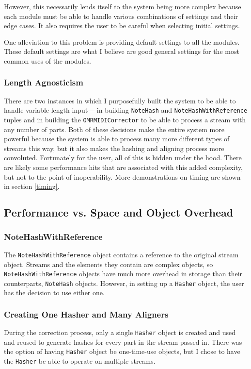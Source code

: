 However, this necessarily lends itself to the system being more complex because each module must be able to handle various combinations of settings and their edge cases. It also requires the user to be careful when selecting initial settings. 

One alleviation to this problem is providing default settings to all the modules. These default settings are what I believe are good general settings for the most common uses of the modules. 

\subsubsection{Length Agnosticism}
There are two instances in which I purposefully built the system to be able to handle variable length input--- in building \texttt{NoteHash} and \texttt{NoteHashWithReference} tuples and in building the \texttt{OMRMIDICorrector} to be able to process a stream with any number of parts. Both of these decisions make the entire system more powerful because the system is able to process many more different types of streams this way, but it also makes the hashing and aligning process more convoluted. Fortunately for the user, all of this is hidden under the hood. There are likely some performance hits that are associated with this added complexity, but not to the point of inoperability. More demonstrations on timing are shown in section \ref{timing}.

\subsection{Performance vs. Space and Object Overhead}

\subsubsection{NoteHashWithReference}
The \texttt{NoteHashWithReference} object contains a reference to the original stream object. Streams and the elements they contain are complex objects, so \texttt{NoteHashWithReference} objects have much more overhead in storage than their counterparts, \texttt{NoteHash} objects. However, in setting up a \texttt{Hasher} object, the user has the decision to use either one.   

\subsubsection{Creating One Hasher and Many Aligners}
During the correction process, only a single \texttt{Hasher} object is created and used and reused to generate hashes for every part in the stream passed in. There was the option of having \texttt{Hasher} object be one-time-use objects, but I chose to have the \texttt{Hasher} be able to operate on multiple streams. 

